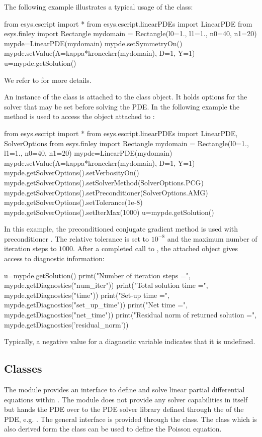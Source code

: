 The following example illustrates a typical usage of the \LinearPDE class:
\begin{python}
  from esys.escript import *
  from esys.escript.linearPDEs import LinearPDE
  from esys.finley import Rectangle
  mydomain = Rectangle(l0=1., l1=1., n0=40, n1=20)
  mypde=LinearPDE(mydomain)
  mypde.setSymmetryOn()
  mypde.setValue(A=kappa*kronecker(mydomain), D=1, Y=1)
  u=mypde.getSolution()
\end{python}
We refer to  for more details.

An instance of the \SolverOptions class is attached to the \LinearPDE class
object. It holds options for the solver that may be set before solving the PDE.
In the following example the  method is used to
access the \SolverOptions object attached to :
\begin{python}
  from esys.escript import *
  from esys.escript.linearPDEs import LinearPDE, SolverOptions
  from esys.finley import Rectangle
  mydomain = Rectangle(l0=1., l1=1., n0=40, n1=20)
  mypde=LinearPDE(mydomain)
  mypde.setValue(A=kappa*kronecker(mydomain), D=1, Y=1)
  mypde.getSolverOptions().setVerbosityOn()
  mypde.getSolverOptions().setSolverMethod(SolverOptions.PCG)
  mypde.getSolverOptions().setPreconditioner(SolverOptions.AMG)
  mypde.getSolverOptions().setTolerance(1e-8)
  mypde.getSolverOptions().setIterMax(1000)
  u=mypde.getSolution()
\end{python}
In this example, the preconditioned conjugate gradient method \PCG is used
with preconditioner \AMG. The relative tolerance is set to $10^{-8}$ and
the maximum number of iteration steps to $1000$.
After a completed call to , the attached \SolverOptions
object gives access to diagnostic information:
\begin{python}
  u=mypde.getSolution()
  print("Number of iteration steps =", mypde.getDiagnostics("num_iter"))
  print("Total solution time =", mypde.getDiagnostics("time"))
  print("Set-up time =", mypde.getDiagnostics("set_up_time"))
  print("Net time =", mypde.getDiagnostics("net_time"))
  print("Residual norm of returned solution =", 
      mypde.getDiagnostics('residual_norm'))
\end{python}
Typically, a negative value for a diagnostic variable indicates that it is
undefined.

\subsection{Classes}
The module \linearPDEs provides an interface to define and solve linear partial
differential equations within \escript. The module \linearPDEs does not
provide any solver capabilities in itself but hands the PDE over to the PDE
solver library defined through the \Domain of the PDE, e.g. \finley.
The general interface is provided through the \LinearPDE class. The \Poisson
class which is also derived form the \LinearPDE class can be used to define
the Poisson equation.

